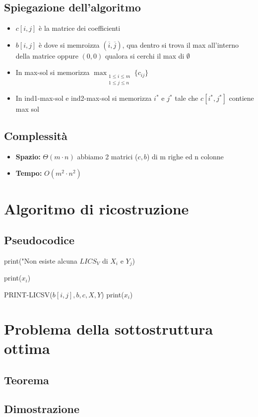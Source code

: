 \subsection{Spiegazione dell'algoritmo}
\begin{itemize}
    \item $c[i,j]$ è la matrice dei coefficienti
    \item $b[i,j]$ è dove si memroizza $(\overline{i}, \overline{j})$, qua dentro si trova il max all'interno della matrice oppure $(0,0)$ qualora si cerchi il max di $\emptyset$
    \item In max-sol si memorizza $\max_{\substack{1 \leq i \leq m \\ 1 \leq j \leq n}} \{ c_{ij} \}$
    \item In ind1-max-sol e ind2-max-sol si memorizza $i^*$ e $j^*$ tale che $c[i^*, j^*]$ contiene max sol
\end{itemize}
\subsection{Complessità}
\begin{itemize}
    \item \textbf{Spazio:} $\Theta(m \cdot n)$ abbiamo 2 matrici ($c,b$) di m righe ed n colonne
    
    \item \textbf{Tempo:} $O(m^2 \cdot n^2)$
\end{itemize}

\newpage
\section{Algoritmo di ricostruzione}
\subsection{Pseudocodice}
\begin{algorithm}
    \caption{Ricostruzione di una LICS}
    \begin{algorithmic}
             
                \State print("Non esiste alcuna $LICS_V$ di $X_i$ e $Y_j$)
            
            \Else
                 
                    \State print($x_i$)

                    \Else {}
                        \State PRINT-LICSV($b[i,j],b,c,X,Y$)
                        \State print($x_i$) 
                \EndIf

            \EndIf
        \EndProcedure
    \end{algorithmic}
\end{algorithm}

\newpage
\section{Problema della sottostruttura ottima}
\subsection{Teorema}
\subsection{Dimostrazione}